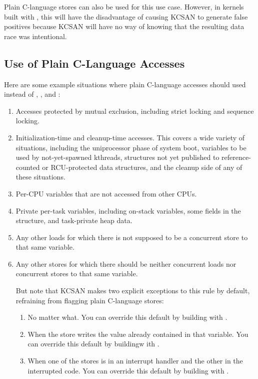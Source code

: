 Plain C-language stores can also be used for this use case.
However, in kernels built with ,
this will have the disadvantage of causing KCSAN to generate false positives
because KCSAN will have no way of knowing that the resulting data race
was intentional.


\subsection{Use of Plain C-Language Accesses}

Here are some example situations where plain C-language accesses should
used instead of , , and :

\begin{enumerate}
\item	Accesses protected by mutual exclusion, including strict locking
	and sequence locking.

\item	Initialization-time and cleanup-time accesses.
	This covers a wide variety of situations, including the uniprocessor
	phase of system boot, variables to be used by not-yet-spawned kthreads,
	structures not yet published to reference-counted or RCU-protected
	data structures, and the cleanup side of any of these situations.

\item	Per-CPU variables that are not accessed from other CPUs.

\item	Private per-task variables, including on-stack variables, some
	fields in the  structure, and task-private heap data.

\item	Any other loads for which there is not supposed to be a concurrent
	store to that same variable.

\item	Any other stores for which there should be neither concurrent
	loads nor concurrent stores to that same variable.

	But note that KCSAN makes two explicit exceptions to this rule
	by default, refraining from flagging plain C-language stores:

	\begin{enumerate}
	\item	No matter what.
		You can override this default by building
		with .

	\item	When the store writes the value already contained in
		that variable.
		You can override this default by buildingw ith
		.

	\item	When one of the stores is in an interrupt handler and
		the other in the interrupted code.
		You can override this default by building with
		.
	\end{enumerate}
\end{enumerate}

